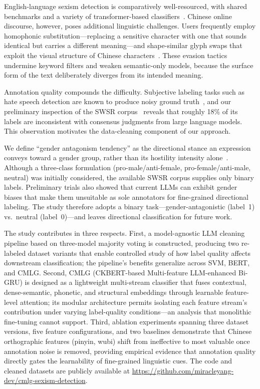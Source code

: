 ﻿\documentclass[12pt]{article}
\begin{document}
English-language sexism detection is comparatively well-resourced, with shared benchmarks and a variety of transformer-based classifiers~\cite{gutam2025feminist,singh2025misogynistic,vivekananda2025integrating,mohasseb2025leveraging,fortuna2018survey,davidson2017offensive}. Chinese online discourse, however, poses additional linguistic challenges. Users frequently employ homophonic substitution---replacing a sensitive character with one that sounds identical but carries a different meaning---and shape-similar glyph swaps that exploit the visual structure of Chinese characters~\cite{ma2024gender}. These evasion tactics undermine keyword filters and weaken semantic-only models, because the surface form of the text deliberately diverges from its intended meaning.

Annotation quality compounds the difficulty. Subjective labeling tasks such as hate speech detection are known to produce noisy ground truth~\cite{frenay2014label,song2023noisy}, and our preliminary inspection of the SWSR corpus~\cite{jiang2022swsr} reveals that roughly 18\% of its labels are inconsistent with consensus judgments from large language models. This observation motivates the data-cleaning component of our approach.

We define ``gender antagonism tendency'' as the directional stance an expression conveys toward a gender group, rather than its hostility intensity alone~\cite{qin2024impact}. Although a three-class formulation (pro-male/anti-female, pro-female/anti-male, neutral) was initially considered, the available SWSR corpus supplies only binary labels. Preliminary trials also showed that current LLMs can exhibit gender biases that make them unsuitable as sole annotators for fine-grained directional labeling. The study therefore adopts a binary task---gender-antagonistic (label~1) vs.\ neutral (label~0)---and leaves directional classification for future work.

The study contributes in three respects. First, a model-agnostic LLM cleaning pipeline based on three-model majority voting is constructed, producing two re-labeled dataset variants that enable controlled study of how label quality affects downstream classification; the pipeline's benefits generalize across SVM, BERT, and CMLG. Second, CMLG (CKBERT-based Multi-feature LLM-enhanced Bi-GRU) is designed as a lightweight multi-stream classifier that fuses contextual, dense-semantic, phonetic, and structural embeddings through learnable feature-level attention; its modular architecture permits isolating each feature stream's contribution under varying label-quality conditions---an analysis that monolithic fine-tuning cannot support. Third, ablation experiments spanning three dataset versions, five feature configurations, and two baselines demonstrate that Chinese orthographic features (pinyin, wubi) shift from ineffective to most valuable once annotation noise is removed, providing empirical evidence that annotation quality directly gates the learnability of fine-grained linguistic cues. The code and cleaned datasets are publicly available at \url{https://github.com/miracleyang-dev/cmlg-sexism-detection}.
\end{document}
